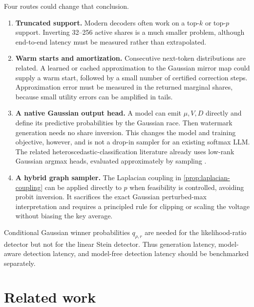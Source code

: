 \documentclass[11pt]{article}
\theoremstyle{definition}
\theoremstyle{remark}
\begin{document}
Four routes could change that conclusion.

\begin{enumerate}
\item \textbf{Truncated support.} Modern decoders often work on a top-$k$ or top-$p$ support. Inverting 32--256 active shares is a much smaller problem, although end-to-end latency must be measured rather than extrapolated.

\item \textbf{Warm starts and amortization.} Consecutive next-token distributions are related. A learned or cached approximation to the Gaussian mirror map could supply a warm start, followed by a small number of certified correction steps. Approximation error must be measured in the returned marginal shares, because small utility errors can be amplified in tails.

\item \textbf{A native Gaussian output head.} A model can emit $\mu,V,D$ directly and define its predictive probabilities by the Gaussian race. Then watermark generation needs no share inversion. This changes the model and training objective, however, and is not a drop-in sampler for an existing softmax LLM. The related heteroscedastic-classification literature already uses low-rank Gaussian argmax heads, evaluated approximately by sampling \citep{collier2021correlated}.

\item \textbf{A hybrid graph sampler.} The Laplacian coupling in \cref{prop:laplacian-coupling} can be applied directly to $p$ when feasibility is controlled, avoiding probit inversion. It sacrifices the exact Gaussian perturbed-max interpretation and requires a principled rule for clipping or scaling the voltage without biasing the key average.
\end{enumerate}

Conditional Gaussian winner probabilities $q_{\rho,r}$ are needed for the likelihood-ratio detector but not for the linear Stein detector. Thus generation latency, model-aware detection latency, and model-free detection latency should be benchmarked separately.

\section{Related work}
\label{sec:related}
\end{document}
